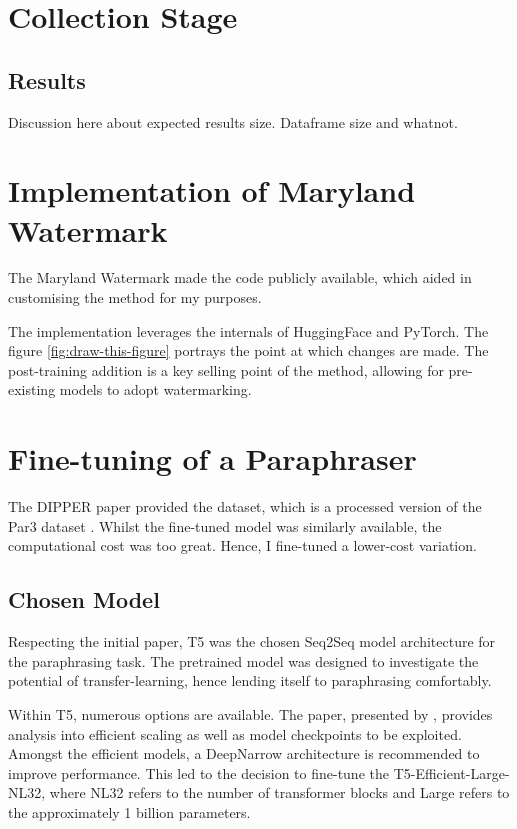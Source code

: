 \documentclass{l4proj}
\theoremstyle{definition}
\begin{document}
\section{Collection Stage}
    \subsection{Results}
        Discussion here about expected results size. Dataframe size and whatnot.
    
\section{Implementation of Maryland Watermark}
    The Maryland Watermark \citep{kirchenbauer2023watermark} made the code publicly available, which aided in customising the method for my purposes.

    The implementation leverages the internals of HuggingFace and PyTorch. The figure \ref{fig:draw-this-figure} portrays the point at which changes are made. The post-training addition is a key selling point of the method, allowing for pre-existing models to adopt watermarking.


\section{Fine-tuning of a Paraphraser}
    The DIPPER paper \citep{krishna2023paraphrasing} provided the dataset, which is a processed version of the Par3 dataset \citep{Par3_2022}. Whilst the fine-tuned model was similarly available, the computational cost was too great. Hence, I fine-tuned a lower-cost variation.

    \subsection{Chosen Model}
        Respecting the initial paper, T5 was the chosen Seq2Seq model architecture for the paraphrasing task. The pretrained model was designed to investigate the potential of transfer-learning, hence lending itself to paraphrasing comfortably. 

        Within T5, numerous options are available. The paper, presented by \citet{tay2022scale}, provides analysis into efficient scaling as well as model checkpoints to be exploited. Amongst the efficient models, a DeepNarrow architecture is recommended to improve performance. This led to the decision to fine-tune the T5-Efficient-Large-NL32, where NL32 refers to the number of transformer blocks and Large refers to the approximately 1 billion parameters.
\end{document}
